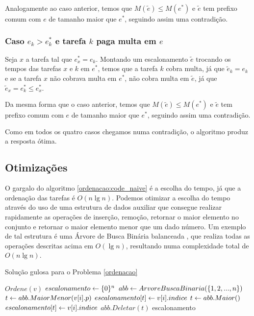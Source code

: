 Analogamente ao caso anterior, temos que $M(\widetilde{e}) \leq M(e^*)$ e $\widetilde{e}$ tem prefixo comum com $e$ de tamanho maior que $e^*$, seguindo assim uma contradição.

\subsubsection*{Caso $e_k > e^*_k$ e tarefa $k$ paga multa em $e$}

Seja $x$ a tarefa tal que $e^*_x = e_k$. Montando um escalonamento $\widetilde{e}$ trocando os tempos das tarefas $x$ e $k$ em $e^*$, temos que a tarefa $k$ cobra multa, já que $\widetilde{e}_k = e_k$ e se a tarefa $x$ não cobrava multa em $e^*$, não cobra multa em $\widetilde{e}$, já que $\widetilde{e}_x = e^*_k \leq e^*_x$.

Da mesma forma que o caso anterior, temos que $M(\widetilde{e}) \leq M(e^*)$ e $\widetilde{e}$ tem prefixo comum com $e$ de tamanho maior que $e^*$, seguindo assim uma contradição.

Como em todos os quatro casos chegamos numa contradição, o algoritmo produz a resposta ótima.

\subsection{Otimizações}

O gargalo do algoritmo \ref{ordenacao:code_naive} é a escolha do tempo, já que a ordenação das tarefas é $O(n \lg n)$. Podemos otimizar a escolha do tempo através do uso de uma estrutura de dados auxiliar que consegue realizar rapidamente as operações de inserção, remoção, retornar o maior elemento no conjunto e retornar o maior elemento menor que um dado número. Um exemplo de tal estrutura é uma Árvore de Busca Binária balanceada \cite{mehta2004handbook}, que realiza todas as operações descritas acima em $O(\lg n)$, resultando numa complexidade total de $O(n \lg n)$.

\begin{algorithm}[H]
\caption{Solução gulosa para o Problema \ref{ordenacao}}
\label{ordenacao:code}
\begin{algorithmic}[1]
    \State $Ordene(v)$ 
    \State $escalonamento \leftarrow \{0\}^n$
    \State $abb \leftarrow ArvoreBuscaBinaria(\{1, 2, ..., n\})$
        \State $t \leftarrow abb.MaiorMenor(v[i].p)$
            \State $escalonamento[t] \leftarrow v[i].indice$
        \Else
            \State $t \leftarrow abb.Maior()$
            \State $escalonamento[t] \leftarrow v[i].indice$
        \EndIf
        \State $abb.Deletar(t)$
    \EndFor
    \State \Return escalonamento
\EndFunction
\end{algorithmic}
\end{algorithm}

